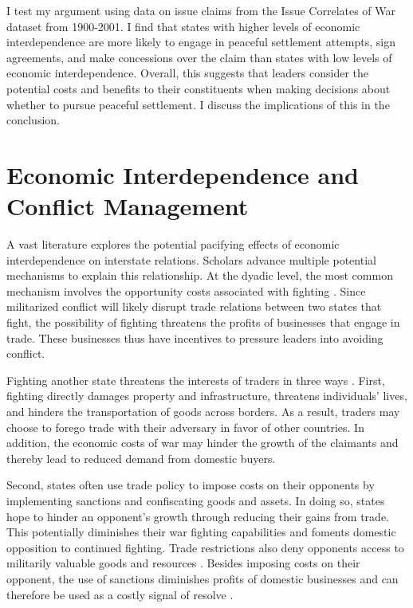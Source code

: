 \documentclass[../../dissertation.tex]{subfiles}
\begin{document}

I test my argument using data on issue claims from the Issue Correlates of War dataset from 1900-2001. I find that states with higher levels of economic interdependence are more likely to engage in peaceful settlement attempts, sign agreements, and make concessions over the claim than states with low levels of economic interdependence. Overall, this suggests that leaders consider the potential costs and benefits to their constituents when making decisions about whether to pursue peaceful settlement. I discuss the implications of this in the conclusion.

\section{Economic Interdependence and Conflict Management}


A vast literature explores the potential pacifying effects of economic interdependence on interstate relations. Scholars advance multiple potential mechanisms to explain this relationship. At the dyadic level, the most common mechanism involves the opportunity costs associated with fighting \citep[e.g.,][]{crescenzi2003a, doyle1997, polachek1980, rosecrance1986, russett2001}. Since militarized conflict will likely disrupt trade relations between two states that fight, the possibility of fighting threatens the profits of businesses that engage in trade. These businesses thus have incentives to pressure leaders into avoiding conflict.

% 
Fighting another state threatens the interests of traders in three ways \citep{anderton2001, glick2010, keshk2004, kim2005, long2008, polachek1980}. First, fighting directly damages property and infrastructure, threatens individuals’ lives, and hinders the transportation of goods across borders. As a result, traders may choose to forego trade with their adversary in favor of other countries. In addition, the economic costs of war may hinder the growth of the claimants and thereby lead to reduced demand from domestic buyers. 

Second, states often use trade policy to impose costs on their opponents by implementing sanctions and confiscating goods and assets. In doing so, states hope to hinder an opponent’s growth through reducing their gains from trade. This potentially diminishes their war fighting capabilities and foments domestic opposition to continued fighting. Trade restrictions also deny opponents access to militarily valuable goods and resources \citep{gowa1994}. Besides imposing costs on their opponent, the use of sanctions diminishes profits of domestic businesses and can therefore be used as a costly signal of resolve \citep{gartzke2001, morrow1999a}.
\end{document}

